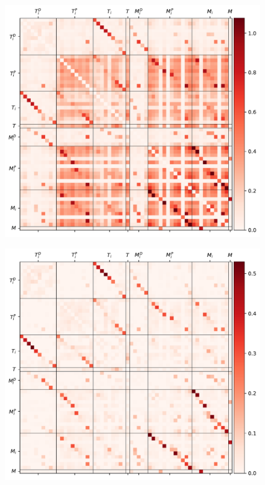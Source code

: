 \documentclass[../Thesis.tex]{subfiles}
\begin{document}
\begin{figure}[ht]
    \centering
    \includegraphics[width = 1\linewidth]{figures/Cycle data/G_obs complete - symmetric.pdf}
    \caption{}
    \label{fig:Cycle data - G_obs all}
\end{figure}






\newpage
\begin{figure}[ht]
    \centering
    \includegraphics[width = .9\linewidth]{figures/Cycle data/G_dir complete - symmetric.pdf}
    \caption{}
    \label{fig:Cycle data - G_dir all}
\end{figure}
\end{document}

